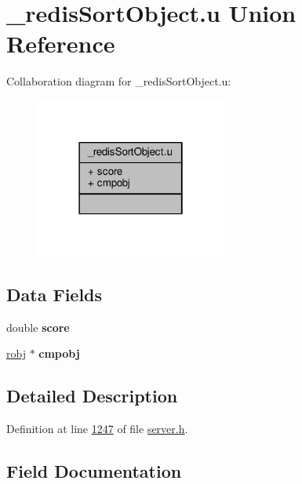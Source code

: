 \hypertarget{union__redisSortObject_8u}{}\section{\+\_\+redis\+Sort\+Object.\+u Union Reference}
\label{union__redisSortObject_8u}


Collaboration diagram for \+\_\+redis\+Sort\+Object.\+u\+:\nopagebreak
\begin{figure}[H]
\begin{center}
\leavevmode
\includegraphics[width=178pt]{union__redisSortObject_8u__coll__graph}
\end{center}
\end{figure}
\subsection*{Data Fields}
\begin{DoxyCompactItemize}
\item 
\mbox{\label{union__redisSortObject_8u_aca1cd3c3055991bf20499ee86739f7e2}} 
double {\bfseries score}
\item 
\mbox{\label{union__redisSortObject_8u_aa5848be22772156621af135260c2210f}} 
\hyperlink{structredisObject}{robj} $\ast$ {\bfseries cmpobj}
\end{DoxyCompactItemize}


\subsection{Detailed Description}


Definition at line \hyperlink{server_8h_source_l01247}{1247} of file \hyperlink{server_8h_source}{server.\+h}.



\subsection{Field Documentation}
\mbox{\label{union__redisSortObject_8u_aa5848be22772156621af135260c2210f}} 

